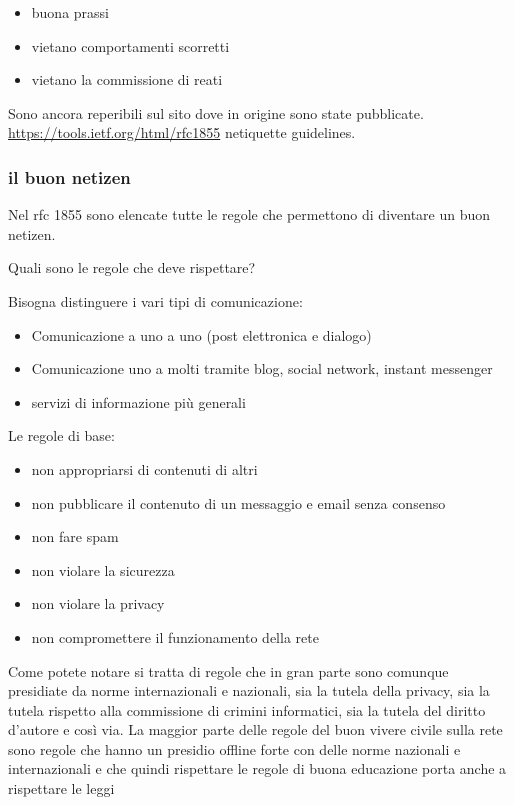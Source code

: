 \begin{itemize}
    \item buona prassi
    \item vietano comportamenti scorretti
    \item vietano la commissione di reati
\end{itemize}

Sono ancora reperibili sul sito dove in origine sono state pubblicate. \href{https://tools.ietf.org/html/rfc1855}{https://tools.ietf.org/html/rfc1855} netiquette guidelines.

\subsubsection{il buon netizen}

Nel rfc 1855 sono elencate tutte le regole che permettono di diventare un buon netizen.

Quali sono le regole che deve rispettare?

Bisogna distinguere i vari tipi di comunicazione:
\begin{itemize}
    \item Comunicazione a uno a uno (post elettronica e dialogo)
    \item Comunicazione uno a molti tramite blog, social network, instant messenger
    \item servizi di informazione più generali
\end{itemize}

Le regole di base:
\begin{itemize}
    \item non appropriarsi di contenuti di altri
    \item non pubblicare il contenuto di un messaggio e email senza consenso
    \item non fare spam
    \item non violare la sicurezza
    \item non violare la privacy
    \item non compromettere il funzionamento della rete
\end{itemize}

Come potete notare si tratta di regole che in gran parte sono comunque presidiate da norme internazionali e nazionali, sia la tutela della privacy, sia la tutela rispetto alla commissione di crimini informatici, sia la tutela del diritto d'autore e così via. La maggior parte delle regole del buon vivere civile sulla rete sono regole che hanno un presidio offline forte con delle norme nazionali e internazionali e che quindi rispettare le regole di buona educazione porta anche a rispettare le leggi

